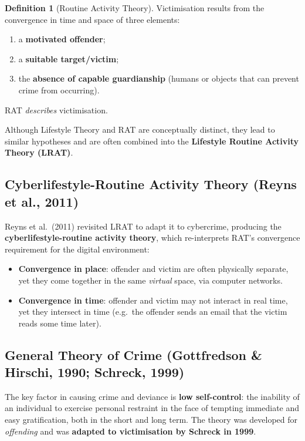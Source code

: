 \documentclass[11pt,a4paper,openany]{report}
\theoremstyle{definition}
\newtheorem{definition}{Definition}[chapter]
\theoremstyle{plain}
\theoremstyle{remark}
\begin{document}
\begin{definition}[Routine Activity Theory]
Victimisation results from the convergence in time and space of three elements:
\begin{enumerate}
    \item a \textbf{motivated offender};
    \item a \textbf{suitable target/victim};
    \item the \textbf{absence of capable guardianship} (humans or objects that can prevent crime from occurring).
\end{enumerate}
RAT \textit{describes} victimisation.
\end{definition}

Although Lifestyle Theory and RAT are conceptually distinct, they lead to similar hypotheses and are often combined into the \textbf{Lifestyle Routine Activity Theory (LRAT)}.

\subsection{Cyberlifestyle-Routine Activity Theory (Reyns et al., 2011)}

Reyns et al.\ (2011) revisited LRAT to adapt it to cybercrime, producing the \textbf{cyberlifestyle-routine activity theory}, which re-interprets RAT's convergence requirement for the digital environment:
\begin{itemize}
    \item \textbf{Convergence in place}: offender and victim are often physically separate, yet they come together in the same \textit{virtual} space, via computer networks.
    \item \textbf{Convergence in time}: offender and victim may not interact in real time, yet they intersect in time (e.g.\ the offender sends an email that the victim reads some time later).
\end{itemize}

\subsection{General Theory of Crime (Gottfredson \& Hirschi, 1990; Schreck, 1999)}

The key factor in causing crime and deviance is \textbf{low self-control}: the inability of an individual to exercise personal restraint in the face of tempting immediate and easy gratification, both in the short and long term. The theory was developed for \textit{offending} and was \textbf{adapted to victimisation by Schreck in 1999}.
\end{document}
